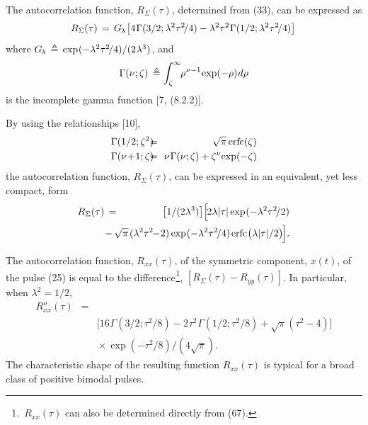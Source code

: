 \documentclass[journal]{IEEEtran}
\begin{document}
The autocorrelation function, $R_\Sigma(\tau)$, determined from (33), can be expressed as
\begin{equation}
	R_\Sigma(\tau) \,=\,G_{\mspace{-2mu} \lambda} \mspace{1mu}
	\big[4\mspace{1mu}{\Gamma}(3/2;\lambda^2\tau^2\!/4) -
	\lambda^2\tau^2 \mspace{1mu}{\Gamma}(1/2;\lambda^2\tau^2\!/4)\big] \,
\end{equation}
where $G_{\mspace{-2mu} \lambda} \,\triangleq\, \exp\mspace{1mu}(-\lambda^2\tau^2\!/4) / (2\mspace{1mu}\lambda^3)$, and
\begin{equation*}
	\Gamma(\nu;\zeta) \,\triangleq \int_\zeta^\infty \mspace{-5mu} \rho^{\mspace{1mu}\nu-1}\mspace{-2mu}\exp(-\rho)\mspace{1mu} d\rho
\end{equation*}
is the incomplete gamma function [7, (8.2.2)].

By using the relationships [10],
\begin{eqnarray*}
	\Gamma(1/2;\zeta^2)\!\! &\!\!=\!\!& \! \sqrt{\pi}\, \mathrm{erfc}(\zeta) \\
	\Gamma(\nu\!+\!1;\zeta)\!\! &\!\!=\!\!& \nu\mspace{1mu}\Gamma(\nu;\zeta) + \zeta^\nu \mspace{-3mu}\exp(-\zeta)
\end{eqnarray*}
the autocorrelation function, $R_\Sigma(\tau)$, can be expressed in an equivalent, 
yet less compact, form
\begin{eqnarray*}
	R_\Sigma(\tau)\, =   \mspace{-25mu}  &{}&\big[1/(2\lambda^3)\big] \Big [ \mspace{-2mu}  
	2\lambda|\tau| \exp\mspace{1mu}(-\lambda^2\tau^2\!/2) \\
	&{}& \mspace{-14mu}-\,\sqrt{\pi} \mspace{2mu} (\lambda^2\tau^2\mspace{-6mu}-\!2) 
	\exp\mspace{1mu}(-\lambda^2\tau^2\!/4)\mspace{2mu}
	\mathrm{erfc}\mspace{1mu}\big(\lambda|\tau|/2
		\big) \mspace{-2mu}	\Big ].
\end{eqnarray*}

The autocorrelation function, $R_{xx}(\tau)$, of the symmetric component, $x(t)$, of the pulse (25) is equal to the difference$\mspace{1mu}${\footnote {
\,$R_{xx}(\tau)$ can also be determined directly from (67).}}, $[R_\Sigma(\tau)\!-\!R_{yy}(\tau)]$. 
In particular, when $\lambda^2=1/2$,
\begin{eqnarray*}
	R^{\mspace{1mu}o}_{xx}(\tau) \!\! &\!\!=\!\!& \\
	 &\!\!{}\!\!& \!\!\!\!	\big[ 16\mspace{1mu}{\Gamma}(3/2;\tau^2\!/8)-
	2\mspace{1mu}\tau^2 \mspace{1mu}{\Gamma}(1/2;\tau^2\!/8)
	+ \sqrt{\pi}(\tau^2\!-\!4)
	\big]\\
	 &\!\!{}\!\!& \!\!\!\!\times \exp(-\tau^2\!/8) /(4\sqrt{\pi}).
\end{eqnarray*}
The characteristic shape of the resulting function $R_{xx}(\tau)$ is typical for a broad class of positive bimodal pulses.
\end{document}
